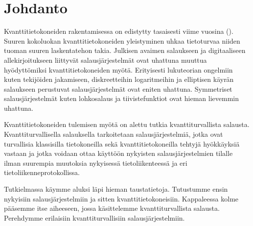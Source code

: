 \chapter{Johdanto\label{intro}}
Kvanttitietokoneiden rakentamisessa on edistytty tasaisesti viime vuosina (\cite{alagic2020status}). Suuren kokoluokan kvanttitietokoneiden yleistyminen uhkaa tietoturvaa niiden tuoman suuren laskentatehon takia. Julkisen avaimen salaukseen ja digitaaliseen allekirjoitukseen liittyvät salausjärjestelmät ovat uhattuna muuttua hyödyttömiksi kvanttitietokoneiden myötä. Erityisesti lukuteorian ongelmiin kuten tekijöiden jakamiseen, diskreetteihin logaritmeihin ja elliptisen käyrän salaukseen perustuvat salausjärjestelmät ovat eniten uhattuna. Symmetriset salausjärjestelmät kuten lohkosalaus ja tiivistefunktiot ovat hieman lievemmin uhattuna.

Kvanttitietokoneiden tulemisen myötä on alettu tutkia kvanttiturvallista salausta. Kvanttiturvallisella salauksella tarkoitetaan salausjärjestelmiä, jotka ovat turvallisia klassisilla tietokoneilla sekä kvanttitietokoneilla tehtyjä hyökkäyksiä vastaan ja jotka voidaan ottaa käyttöön nykyisten salausjärjestelmien tilalle ilman suurempia muutoksia nykyisessä tietoliikenteessä ja eri tietoliikenneprotokollissa.

Tutkielmassa käymme aluksi läpi hieman taustatietoja. Tutustumme ensin nykyisiin salausjärjestelmiin ja sitten kvanttitietokoneisiin. Kappaleessa kolme pääsemme itse aiheeseen, jossa käsittelemme kvanttiturvallista salausta. Perehdymme erilaisiin kvanttiturvallisiin salausjärjestelmiin.